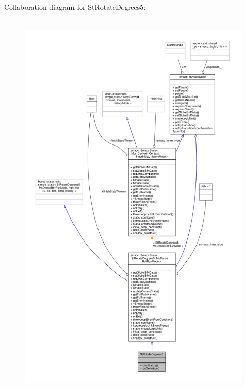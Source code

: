 Collaboration diagram for St\+Rotate\+Degrees5\+:
\nopagebreak
\begin{figure}[H]
\begin{center}
\leavevmode
\includegraphics[height=550pt]{structStRotateDegrees5__coll__graph}
\end{center}
\end{figure}
